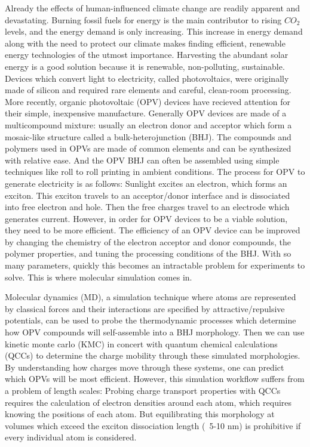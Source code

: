 Already the effects of human-influenced climate change are readily apparent and devastating. %
Burning fossil fuels for energy is the main contributor to rising $CO_{2}$ levels, and the energy demand is only increasing.
This increase in energy demand along with the need to protect our climate makes finding efficient, renewable energy technologies of the utmost importance.
Harvesting the abundant solar energy is a good solution because it is renewable, non-polluting, sustainable.
Devices which convert light to electricity, called photovoltaics, were originally made of silicon and required rare elements and careful, clean-room processing.
More recently, organic photovoltaic (OPV) devices have recieved attention for their simple, inexpensive manufacture.
Generally OPV devices are made of a multicompound mixture: usually an electron donor and acceptor which form a mosaic-like structure called a bulk-heterojunction (BHJ).
The compounds and polymers used in OPVs are made of common elements and can be synthesized with relative ease.
And the OPV BHJ can often be assembled using simple techniques like roll to roll printing in ambient conditions.
The process for OPV to generate electricity is as follows: 
Sunlight excites an electron, which forms an exciton.
This exciton travels to an acceptor/donor interface and is dissociated into free electron and hole.
Then the free charges travel to an electrode which generates current.
However, in order for OPV devices to be a viable solution, they need to be more efficient.
The efficiency of an OPV device can be improved by changing the chemistry of the electron acceptor and donor compounds, the polymer properties, and tuning the processing conditions of the BHJ.
With so many parameters, quickly this becomes an intractable problem for experiments to solve.
This is where molecular simulation comes in.

Molecular dynamics (MD), a simulation technique where atoms are represented by classical forces and their interactions are specified by attractive/repulsive potentials, can be used to probe the thermodynamic processes which determine how OPV compounds will self-assemble into a BHJ morphology.
Then we can use kinetic monte carlo (KMC) in concert with quantum chemical calculations (QCCs) to determine the charge mobility through these simulated morphologies.
By understanding how charges move through these systems, one can predict which OPVs will be most efficient.
However, this simulation workflow suffers from a problem of length scales:
Probing charge transport properties with QCCs requires the calculation of electron densities around each atom, which requires knowing the positions of each atom.
But equilibrating this morphology at volumes which exceed the exciton dissociation length (~5-10 nm) is prohibitive if every individual atom is considered.


